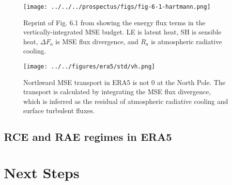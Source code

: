 \documentclass[11pt]{article}
\begin{document}
\begin{figure}[htbp]
\centering
\texttt{[image: ../../../prospectus/figs/fig-6-1-hartmann.png]}
\caption{\label{fig:org04cdb55}Reprint of Fig. 6.1 from \cite{hartmann_global_2016} showing the energy flux terms in the vertically-integrated MSE budget. LE is latent heat, SH is sensible heat, \(\Delta F_a\) is MSE flux divergence, and \(R_a\) is atmospheric radiative cooling.}
\end{figure}

\begin{figure}[htbp]
\centering
\texttt{[image: ../../figures/era5/std/vh.png]}
\caption{\label{fig:org0e8e604}Northward MSE transport in ERA5 is not 0 at the North Pole. The transport is calculated by integrating the MSE flux divergence, which is inferred as the residual of atmospheric radiative cooling and surface turbulent fluxes.}
\end{figure}

\subsection{RCE and RAE regimes in ERA5}
\label{sec:org4a486a4}


\section{Next Steps}
\label{sec:orgc196c7a}



\end{document}

